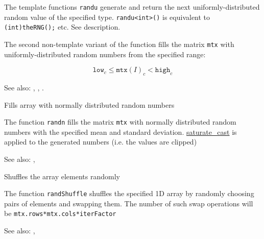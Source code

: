 The template functions \texttt{randu} generate and return the next uniformly-distributed random value of the specified type. \texttt{randu<int>()} is equivalent to \texttt{(int)theRNG();} etc. See  description.

The second non-template variant of the function fills the matrix \texttt{mtx} with uniformly-distributed random numbers from the specified range:

\[\texttt{low}_c \leq \texttt{mtx}(I)_c < \texttt{high}_c\]

See also: , , .

Fills array with normally distributed random numbers

\begin{description}
\end{description}

The function \texttt{randn} fills the matrix \texttt{mtx} with normally distributed random numbers with the specified mean and standard deviation. \hyperref[cppfunc.saturatecast]{saturate\_cast} is applied to the generated numbers (i.e. the values are clipped)

See also: , 

Shuffles the array elements randomly

\begin{description}
\end{description}

The function \texttt{randShuffle} shuffles the specified 1D array by randomly choosing pairs of elements and swapping them. The number of such swap operations will be \texttt{mtx.rows*mtx.cols*iterFactor}

See also: , 

